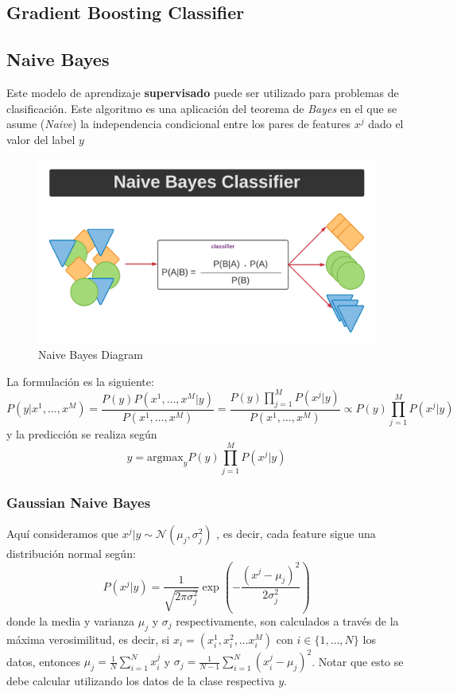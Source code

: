 \subsection{Gradient Boosting Classifier}



\subsection{Naive Bayes}

Este modelo de aprendizaje \textbf{supervisado} puede ser utilizado para problemas de clasificación. Este algoritmo es una aplicación del teorema de \textit{Bayes} en el que se asume (\textit{Naive}) la independencia condicional entre los pares de features $x^j$ dado el valor del label $y$

\begin{figure}[H]
    \center
    \includegraphics[scale=0.4]{notebooks/ML/img/naive_bayes_diagram.png}
    \caption{Naive Bayes Diagram}
\end{figure}

La formulación es la siguiente: 
$$
P(y | x^1 , \dots , x^M) = \frac{P(y)P(x^1 , \dots , x^M| y)}{P(x^1 , \dots , x^M)} = \frac{P(y)\prod_{j=1}^M P(x^j | y)}{P(x^1 , \dots , x^M)} \propto P(y)\prod_{j=1}^M  P(x^j | y)
$$
y la predicción se realiza según 
$$
\hat{y} = \text{argmax}_{y} P(y)\prod_{j=1}^M  P(x^j | y)
$$

\subsubsection{Gaussian Naive Bayes}

Aquí consideramos que $x^{j} | y \sim \mathcal{N}(\mu_j , \sigma_j^2)$ , es decir, cada feature sigue una distribución normal según:
$$
P(x^j | y) = \frac{1}{\sqrt{2\pi\sigma_j^2}}\exp \left(- \frac{(x^j - \mu_j)^2}{2\sigma_j^2} \right )
$$
donde la media y varianza $\mu_j$ y $\sigma_j$ respectivamente, son calculados a través de la máxima verosimilitud, es decir, si $x_{i} = (x^{1}_i, x^{2}_i, \dots x^{M}_i)$ con $i \in \{1, \dots, N\}$ los datos, entonces
$ \mu_{j} = \frac{1}{N}\sum_{i=1}^{N}x_{i}^{j}$ y $ \sigma_{j} = \frac{1}{N-1}\sum_{i=1}^{N}(x_{i}^{j}-\mu_{j})^2$. Notar que esto se debe calcular utilizando los datos de la clase respectiva $y$. 

